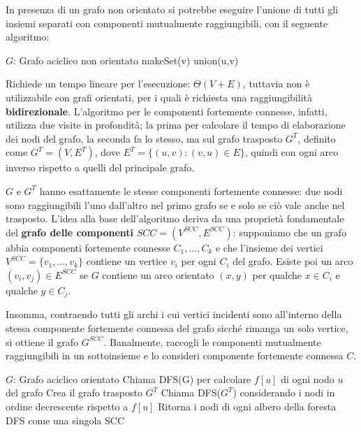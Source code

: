 In presenza di un grafo non orientato si potrebbe eseguire l'unione di tutti gli insiemi separati con componenti mutualmente raggiungibili, con il seguente algoritmo: \begin{algorithm}[h]
	\caption{ConnectedComponents(G)}
	\begin{algorithmic}[i]
		\Require $G$: Grafo aciclico non orientato
		\State makeSet(v)
		\EndFor
		\State union(u,v)
		\EndFor
	\end{algorithmic}
\end{algorithm}

\noindent Richiede un tempo lineare per l'esecuzione: $\Theta(V+E)$, tuttavia non è utilizzabile con grafi orientati, per i quali è richiesta una raggiungibilità \textbf{bidirezionale}. L'algoritmo per le componenti fortemente connesse, infatti, utilizza due visite in profondità; la prima per calcolare il tempo di elaborazione dei nodi del grafo, la seconda fa lo stesso, ma sul grafo trasposto $G^T$, definito come $G^T = (V,E^T)$, dove $E^T = \{(u,v):(v,u)\in E\}$, quindi con ogni arco inverso rispetto a quelli del principale grafo.\par
$G$ e $G^T$ hanno esattamente le stesse componenti fortemente connesse: due nodi sono raggiungibili l'uno dall'altro nel primo grafo se e solo se ciò vale anche nel trasposto. L'idea alla base dell'algoritmo deriva da una proprietà fondamentale del \textbf{grafo delle componenti} $SCC = (V^{SCC}, E^{SCC})$: supponiamo che un grafo abbia componenti fortemente connesse $C_1, ..., C_k$ e che l'insieme dei vertici $V^{SCC} = \{v_1, ..., v_k\}$ contiene un vertice $v_i$ per ogni $C_i$ del grafo. Esiste poi un arco $(v_i,v_j)\in E^{SCC}$ se $G$ contiene un arco orientato $(x,y)$ per qualche $x\in C_i$ e qualche $y\in C_j$.\par
Insomma, contraendo tutti gli archi i cui vertici incidenti sono all'interno della stessa componente fortemente connessa del grafo sicché rimanga un solo vertice, si ottiene il grafo $G^{SCC}$. Banalmente, raccogli le componenti mutualmente raggiungibili in un sottoinsieme e lo consideri componente fortemente connessa $C$. \begin{algorithm}[h]
	\caption{SCC(G)}
	\begin{algorithmic}[i]
		\Require $G$: Grafo aciclico orientato
		\State Chiama DFS(G) per calcolare $f[u]$ di ogni nodo $u$ del grafo
		\State Crea il grafo trasposto $G^T$
		\State Chiama DFS($G^T$) considerando i nodi in ordine decrescente rispetto a $f[u]$
		\State Ritorna i nodi di ogni albero della foresta DFS come una singola SCC
	\end{algorithmic}
\end{algorithm}

